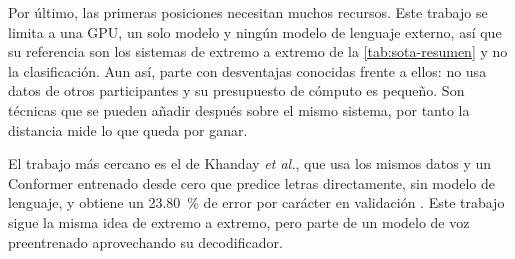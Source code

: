 Por último, las primeras posiciones necesitan muchos recursos. Este trabajo se limita a una GPU, un solo modelo y ningún modelo de lenguaje externo, así que su referencia son los sistemas de extremo a extremo de la \cref{tab:sota-resumen} y no la clasificación. Aun así, parte con desventajas conocidas frente a ellos: no usa datos de otros participantes y su presupuesto de cómputo es pequeño. Son técnicas que se pueden añadir después sobre el mismo sistema, por tanto la distancia mide lo que queda por ganar.

El trabajo más cercano es el de Khanday \textit{et al.}, que usa los mismos datos y un Conformer entrenado desde cero que predice letras directamente, sin modelo de lenguaje, y obtiene un \SI{23.80}{\percent} de error por carácter en validación \cite{khanday2026}. Este trabajo sigue la misma idea de extremo a extremo, pero parte de un modelo de voz preentrenado aprovechando su decodificador.
